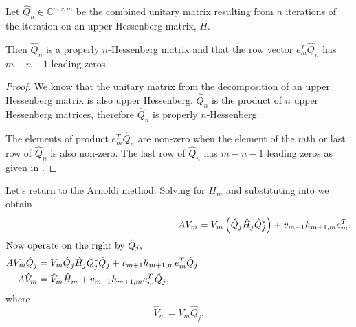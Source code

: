 \begin{col}
    Let $\hat{Q}_n \in \mathbb{C}^{m \times m}$ be the combined unitary matrix resulting from $n$ iterations of the \QR iteration on an upper Hessenberg matrix, $H$.  
    \begin{comment}
        Define a \emph{properly $j$-Hessenberg} $B$ if $b_{ik} = 0$ whenever $\left(i-k\right)>j$ and when $b_{ij} \neq 0$ whenever $\left(i-k\right)=j$.  
    \end{comment}
    Then $\hat{Q}_n$ is a properly $n$-Hessenberg matrix and that the row vector $e_m^T\hat{Q}_n$ has $m-n-1$ leading zeros.
    \label{thm:QRHessenberg}
\end{col}

\begin{proof}
    We know that the unitary matrix from the \QR decomposition of an upper Hessenberg matrix is also upper Hessenberg.  $\hat{Q}_n$ is the product of $n$ upper Hessenberg matrices, therefore $\hat{Q}_n$ is properly $n$-Hessenberg.

    The elements of product $e_m^T\hat{Q}_n$ are non-zero when the element of the $m$th or last row of $\hat{Q}_n$ is also non-zero.  The last row of $\hat{Q}_n$ has $m-n-1$ leading zeros as given in .
\end{proof}

Let's return to the Arnoldi method.  Solving  for $H_m$ and substituting into  we obtain
\begin{align}
    A V_m &= V_m\left(\hat{Q}_j\hat{H}_j\hat{Q}_j^*\right) + v_{m+1}h_{m+1,m}e_m^T. \\
    \intertext{Now operate on the right by $\hat{Q}_j$,}
    \begin{split}
        A V_m\hat{Q}_j &= V_m\hat{Q}_j\hat{H}_j\hat{Q}_j^*\hat{Q}_j + v_{m+1}h_{m+1,m}e_m^T\hat{Q}_j \\
        A \hat{V}_m &= \hat{V}_m\hat{H}_m + v_{m+1}h_{m+1,m}e_m^T\hat{Q}_j, \label{eq:UpdatedIRAM}
    \end{split}
\end{align}
where
\begin{equation}
    \hat{V}_m = V_m\hat{Q}_j.
\end{equation}

